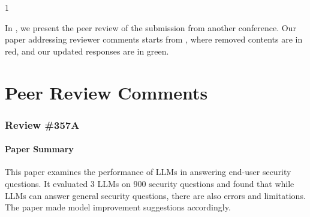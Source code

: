 \documentclass[letterpaper,twocolumn,10pt]{article}
\begin{document}
\newcommand{\failureReason}{Reasons behind this error pattern: }


\renewenvironment{quote}
  {\list{}{\leftmargin=-0.0em%
            \topsep=0pt
            }\item[]\itshape\footnotesize}
{\endlist}

\begin{abstract}
Answering end user security questions is challenging. While large language models (LLMs) like GPT, Llama, and Gemini are far from error-free, they have shown promise in answering a variety of questions outside of security. We qualitatively evaluated responses from three popular LLMs to 900 systematically collected security questions in the first such evaluation in the area of end user security. %

While LLMs demonstrate broad generalist ``knowledge'' of end user security information, there are  
patterns of errors and limitations across LLMs---including stale, inaccurate, and incomplete answers, as well as indirect or unresponsive communication styles---which negatively impact the user experience. Based on these patterns, we suggest directions for improved model development and
recommend user strategies for interacting with LLMs when seeking assistance with security.
\end{abstract}

\def\showreview{2}

\if\showreview1
\newpage

\hrulefill

In , we present the peer review of the submission from another conference. Our paper addressing reviewer comments starts from , where removed contents are in red, and our updated responses are in green.

\hrulefill
\section{Peer Review Comments} \label{review}



\subsubsection*{Review \#357A}
\hrulefill

\paragraph{Paper Summary}
This paper examines the performance of LLMs in answering end-user security questions. It evaluated 3 LLMs on 900 security questions and found that while LLMs can answer general security questions, there are also errors and limitations. The paper made model improvement suggestions accordingly.
\end{document}
